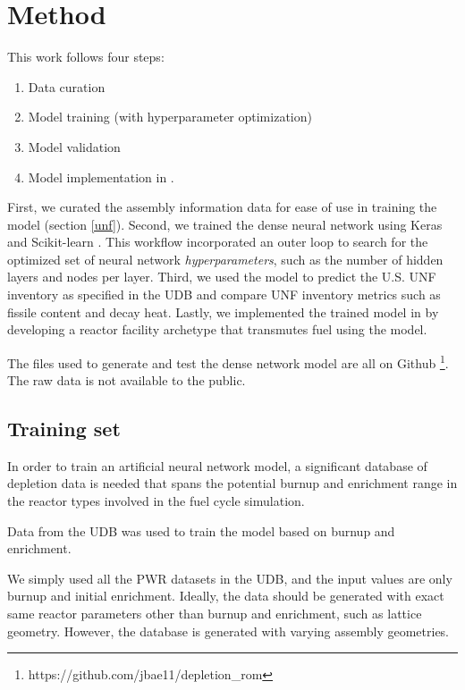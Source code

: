 \section{Method}

This work follows four steps:

\begin{enumerate}
\item Data curation
\item Model training (with hyperparameter optimization)
\item Model validation
\item Model implementation in \Cyclus.
\end{enumerate}


First, we curated the
assembly information data for ease of use in training the model
(section \ref{unf}).
Second, we trained the dense neural network using Keras \cite{collet_keras_2015}
and Scikit-learn \cite{pedregosa_scikit-learn_2011}.
This workflow incorporated an outer loop to
search for the optimized set of neural network \textit{hyperparameters},
such as the number of hidden layers and nodes per layer.
Third, we used the model to predict the U.S. \gls{UNF}
inventory as specified in the \gls{UDB} and compare
\gls{UNF} inventory metrics such as fissile content
and decay heat. Lastly, we implemented the trained
model in \Cyclus by developing a reactor facility archetype
that transmutes fuel using the model.

The files used to generate and test the dense network
model are all on Github \footnote{https://github.com/jbae11/depletion\_rom}.
The raw data
is not available to the public.

\subsection{Training set}

In order to train an artificial neural network model, a significant database of
depletion data is needed that spans the potential
burnup and enrichment range in the reactor types involved
in the fuel cycle simulation.

Data from the \gls{UDB} was used to train the model 
based on burnup and enrichment. 

We simply used all the \gls{PWR} datasets in the \gls{UDB},
and the input values are only burnup and initial enrichment.
Ideally, the data should be generated with exact same reactor
parameters other than burnup and enrichment, such as lattice geometry.
However, the database is generated with varying
assembly geometries. 


